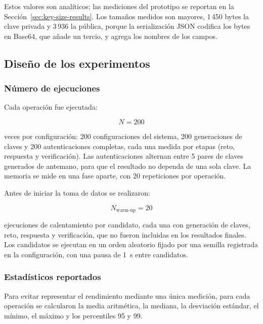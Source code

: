 Estos valores son analíticos; las mediciones del prototipo se reportan en la
Sección~\ref{sec:key-size-results}. Los tamaños medidos son mayores, 1\,450 bytes la clave
privada y 3\,936 la pública, porque la serialización JSON codifica los bytes en Base64, que
añade un tercio, y agrega los nombres de los campos.


\subsection{Diseño de los experimentos}
\label{sec:experimental-design}

\subsubsection{Número de ejecuciones}

Cada operación fue ejecutada:

\begin{equation}
    N = 200
\end{equation}

veces por configuración: 200 configuraciones del sistema, 200 generaciones de claves y 200 autenticaciones completas, cada una medida por etapas (reto, respuesta y verificación). Las autenticaciones alternan entre 5 pares de claves generados de antemano, para que el resultado no dependa de una sola clave. La memoria se mide en una fase aparte, con 20 repeticiones por operación.

Antes de iniciar la toma de datos se realizaron:

\begin{equation}
    N_{\text{warm-up}} = 20
\end{equation}

ejecuciones de calentamiento por candidato, cada una con generación de claves, reto, respuesta y verificación, que no fueron incluidas en los resultados finales. Los candidatos se ejecutan en un orden aleatorio fijado por una semilla registrada en la configuración, con una pausa de 1~s entre candidatos.

\subsubsection{Estadísticos reportados}

Para evitar representar el rendimiento mediante una única medición, para cada operación
se calcularon la media aritmética, la mediana, la desviación estándar, el mínimo, el
máximo y los percentiles 95 y 99.



